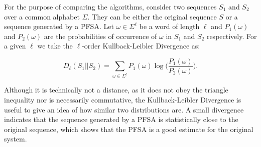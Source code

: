{For the purpose of comparing the algorithms, consider two sequences $S_1$ and $S_2$ over a common alphabet $\Sigma$. They can be either the original sequence $S$ or a sequence generated by a PFSA. Let $\omega\in\Sigma^{\ell}$ be a word of length $\ell$ and $P_1(\omega)$ and $P_2(\omega)$ are the probabilities of occurrence of $\omega$ in $S_1$ and $S_2$ respectively. For a given $\ell$ we take the $\ell$-order Kullback-Leibler Divergence as: 

\begin{equation}
D_{\ell}(S_1||S_2) = \sum_{\omega\in\Sigma^{\ell}}P_1(\omega)\log\Big(\frac{P_1(\omega)}{P_2(\omega)}\Big).	\label{eq:kldl}
\end{equation}

\noindent Although it is technically not a distance, as it does not obey the triangle inequality nor is necessarily commutative, the Kullback-Leibler Divergence is useful to give an idea of how similar two distributions are. A small divergence indicates that the sequence generated by a PFSA is statistically close to the original sequence, which shows that the PFSA is a good estimate for the original system.

%
%
%
%
%

}
